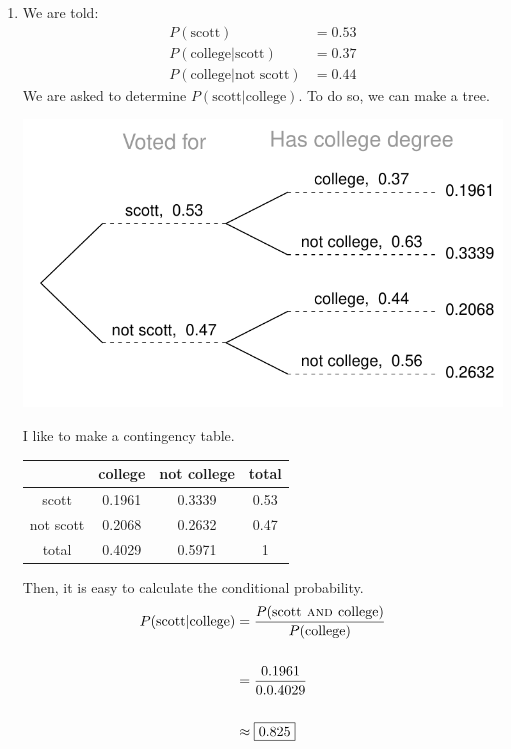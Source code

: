 \documentclass[12pt,letterpaper]{article}
\begin{document}
\begin{enumerate}
\newcommand{\scott}{\text{scott}}
\newcommand{\nscott}{\text{not scott}}
\newcommand{\college}{\text{college}}
\newcommand{\ncollege}{\text{not college}}
\item We are told:
\begin{align*}
P(\scott) &= 0.53 \\
P(\college|\scott) &= 0.37 \\
P(\college|\nscott) &= 0.44
\end{align*}
We are asked to determine $P(\scott|\college)$. To do so, we can make a tree.
\begin{center}
\includegraphics[scale=0.8]{figures/scott.pdf}
\end{center}
I like to make a contingency table.
\begin{center}
\begin{tabular}{c | c c | c} 
         & college& not college    & total \\ \hline
scott    & 0.1961 & 0.3339 & 0.53  \\
not scott& 0.2068 & 0.2632 & 0.47  \\ \hline 
total    & 0.4029 & 0.5971 & 1 
\end{tabular}
\end{center}
Then, it is easy to calculate the conditional probability.
\begin{align*}
P(\text{scott}|\text{college}) &= \frac{P(\text{scott} \textsc{~and~} \text{college})}{P(\text{college})} \\\\
&= \frac{0.1961}{0.0.4029} \\\\
&\approx \fbox{0.825}
\end{align*}

\newpage


\end{enumerate}
\end{document}
